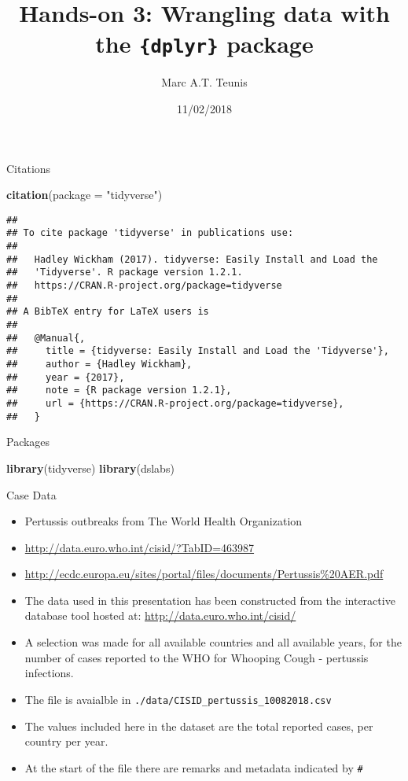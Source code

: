 \documentclass[ignorenonframetext,]{beamer}
\title{Hands-on 3: Wrangling data with the \texttt{\{dplyr\}} package}
\author{Marc A.T. Teunis}
\date{11/02/2018}
\newenvironment{Shaded}{\begin{snugshade}}{\end{snugshade}}
\newcommand{\DataTypeTok}[1]{\textcolor[rgb]{0.13,0.29,0.53}{#1}}
\newcommand{\KeywordTok}[1]{\textcolor[rgb]{0.13,0.29,0.53}{\textbf{#1}}}
\newcommand{\NormalTok}[1]{#1}
\newcommand{\StringTok}[1]{\textcolor[rgb]{0.31,0.60,0.02}{#1}}
\providecommand{\tightlist}{%
  \setlength{\itemsep}{0pt}\setlength{\parskip}{0pt}}
\begin{document}
\frame{\titlepage}

\begin{frame}[fragile]

\begin{block}{Citations}

\begin{Shaded}
\begin{Highlighting}[]
\KeywordTok{citation}\NormalTok{(}\DataTypeTok{package =} \StringTok{"tidyverse"}\NormalTok{)}
\end{Highlighting}
\end{Shaded}

\begin{verbatim}
## 
## To cite package 'tidyverse' in publications use:
## 
##   Hadley Wickham (2017). tidyverse: Easily Install and Load the
##   'Tidyverse'. R package version 1.2.1.
##   https://CRAN.R-project.org/package=tidyverse
## 
## A BibTeX entry for LaTeX users is
## 
##   @Manual{,
##     title = {tidyverse: Easily Install and Load the 'Tidyverse'},
##     author = {Hadley Wickham},
##     year = {2017},
##     note = {R package version 1.2.1},
##     url = {https://CRAN.R-project.org/package=tidyverse},
##   }
\end{verbatim}

\end{block}

\begin{block}{Packages}

\begin{Shaded}
\begin{Highlighting}[]
\KeywordTok{library}\NormalTok{(tidyverse)}
\KeywordTok{library}\NormalTok{(dslabs)}
\end{Highlighting}
\end{Shaded}

\end{block}

\begin{block}{Case Data}

\begin{itemize}
\tightlist
\item
  Pertussis outbreaks from The World Health Organization
\item
  \url{http://data.euro.who.int/cisid/?TabID=463987}
\item
  \url{http://ecdc.europa.eu/sites/portal/files/documents/Pertussis\%20AER.pdf}
\item
  The data used in this presentation has been constructed from the
  interactive database tool hosted at:
  \url{http://data.euro.who.int/cisid/}
\item
  A selection was made for all available countries and all available
  years, for the number of cases reported to the WHO for Whooping Cough
  - pertussis infections.
\item
  The file is avaialble in
  \texttt{./data/CISID\_pertussis\_10082018.csv}
\item
  The values included here in the dataset are the total reported cases,
  per country per year.
\item
  At the start of the file there are remarks and metadata indicated by
  \texttt{\#}
\end{itemize}


\end{block}
\end{frame}
\end{document}
